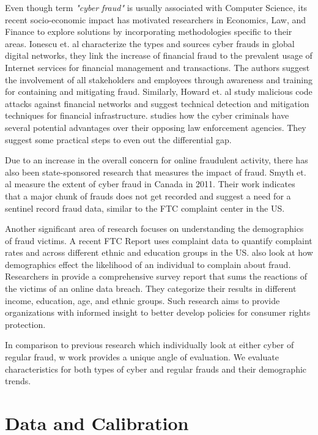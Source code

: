 \documentclass[conference]{IEEEtran}
\begin{document}
Even though term \emph{"cyber fraud"} is usually associated with Computer Science, its recent socio-economic impact has motivated researchers in Economics, Law, and Finance to explore solutions by incorporating methodologies specific to their areas. Ionescu et. al \cite{ionescu2011fraud} characterize the types and sources cyber frauds in global digital networks, they link the increase of financial fraud to the prevalent usage of Internet services for financial management and transactions. The authors suggest the involvement of all stakeholders and employees through awareness and training for containing and mitigating fraud. Similarly, Howard et. al \cite{howard2007cyber} study malicious code attacks against financial networks and suggest technical detection and mitigation techniques for financial infrastructure. \cite{piper2002} studies how the cyber criminals have several potential advantages over their opposing law enforcement agencies. They suggest some practical steps to even out the differential gap.

Due to an increase in the overall concern for online fraudulent activity, there has also been state-sponsored research that measures the impact of fraud. Smyth et. al \cite{smyth2011measuring} measure the extent of cyber fraud in Canada in 2011. Their work indicates that a major chunk of frauds does not get recorded and suggest a need for a sentinel record fraud data, similar to the FTC complaint center in the US.

Another significant area of research focuses on understanding the demographics of fraud victims. A recent FTC Report \cite{raval2016determines} uses complaint data to quantify complaint rates and across different ethnic and education groups in the US. \cite{garrett2010consumers} also look at how demographics effect the likelihood of an individual to complain about fraud. Researchers in \cite{ablon2016consumer} provide a comprehensive survey report that sums the reactions of the victims of an online data breach. They categorize their results in different income, education, age, and ethnic groups. Such research aims to provide organizations with informed insight to better develop policies for consumer rights protection.

In comparison to previous research which individually look at either cyber of regular fraud, w work provides a unique angle of evaluation. We evaluate characteristics for both types of cyber and regular frauds and their demographic trends.

\section{Data and Calibration} \label{data-cal}
\end{document}
